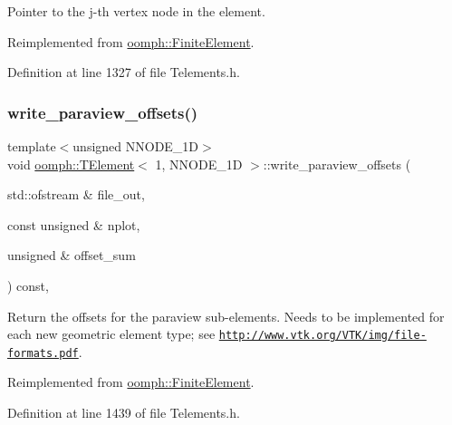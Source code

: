 Pointer to the j-\/th vertex node in the element. 



Reimplemented from \hyperlink{classoomph_1_1FiniteElement_a863c4382c879a77ad5607c6f9781c761}{oomph\+::\+Finite\+Element}.



Definition at line 1327 of file Telements.\+h.

\mbox{\label{classoomph_1_1TElement_3_011_00_01NNODE__1D_01_4_afde96f5476b4ff45a51ae44f29a89f07}} 
\subsubsection{\texorpdfstring{write\+\_\+paraview\+\_\+offsets()}{write\_paraview\_offsets()}}
{\footnotesize\ttfamily template$<$unsigned N\+N\+O\+D\+E\+\_\+1D$>$ \\
void \hyperlink{classoomph_1_1TElement}{oomph\+::\+T\+Element}$<$ 1, N\+N\+O\+D\+E\+\_\+1D $>$\+::write\+\_\+paraview\+\_\+offsets (\begin{DoxyParamCaption}\item[{std\+::ofstream \&}]{file\+\_\+out,  }\item[{const unsigned \&}]{nplot,  }\item[{unsigned \&}]{offset\+\_\+sum }\end{DoxyParamCaption}) const\hspace{0.3cm}{\ttfamily [inline]}, {\ttfamily [virtual]}}



Return the offsets for the paraview sub-\/elements. Needs to be implemented for each new geometric element type; see \href{http://www.vtk.org/VTK/img/file-formats.pdf}{\tt http\+://www.\+vtk.\+org/\+V\+T\+K/img/file-\/formats.\+pdf}. 



Reimplemented from \hyperlink{classoomph_1_1FiniteElement_af11d35779224185e6693f2db450cc111}{oomph\+::\+Finite\+Element}.



Definition at line 1439 of file Telements.\+h.



